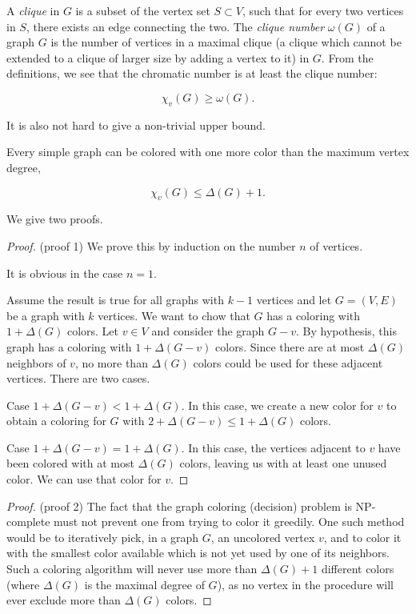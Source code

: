 A {\it clique} in $G$ is a subset of the vertex set $S \subset V$, such that
for every two vertices in $S$, there exists an edge connecting the two.
The {\it clique number} $\omega (G)$ of a graph $G$ is the number of vertices
in a maximal clique (a clique which cannot be extended to a clique of
larger size
by adding a vertex to it) in $G$.
From the definitions, we see that
the chromatic number is at least the clique number:

\[
    \chi_v(G) \ge \omega(G).
\]

It is also not hard to give a non-trivial upper bound.

\begin{theorem}
Every simple graph can be colored with one more color than the
maximum vertex degree,

\[
    \chi_v(G) \le \Delta(G) + 1.
\]
\end{theorem}

We give two proofs.

\begin{proof}
(proof 1)
We prove this by induction on the number $n$ of vertices.

It is obvious in the case $n=1$.

Assume the result is true for all graphs with $k-1$ vertices and let
$G=(V,E)$ be a graph with $k$ vertices. We want to chow that $G$ has a
coloring with $1+\Delta(G)$ colors. Let $v\in V$ and consider the
graph $G-v$. By hypothesis, this graph has a coloring with
$1+\Delta(G-v)$ colors. Since there are at most $\Delta(G)$
neighbors of $v$, no more than $\Delta(G)$ colors could be used for
these adjacent vertices. There are two cases.

Case $1+\Delta(G-v) < 1+\Delta(G)$. In this case, we create a new
color for $v$ to obtain a coloring for $G$ with
$2+\Delta(G-v) \leq 1+\Delta(G)$ colors.

Case $1+\Delta(G-v) = 1+\Delta(G)$. In this case, the vertices adjacent to
$v$ have been colored with at most $\Delta(G)$ colors, leaving us with
at least one unused color. We can use that color for $v$.

\end{proof}

\begin{proof}
(proof 2)
The fact that the graph coloring (decision) problem
is NP-complete must not prevent one from trying to
color it greedily. One such
method would be to iteratively pick, in a graph $G$, an uncolored
vertex $v$, and to color it with the smallest color available which
is not yet used by one of its neighbors.
Such a coloring algorithm will never
use more than $\Delta(G)+1$ different
colors (where $\Delta(G)$ is the maximal degree of $G$), as
no vertex in the procedure will ever exclude more than
$\Delta(G)$ colors.
\end{proof}

